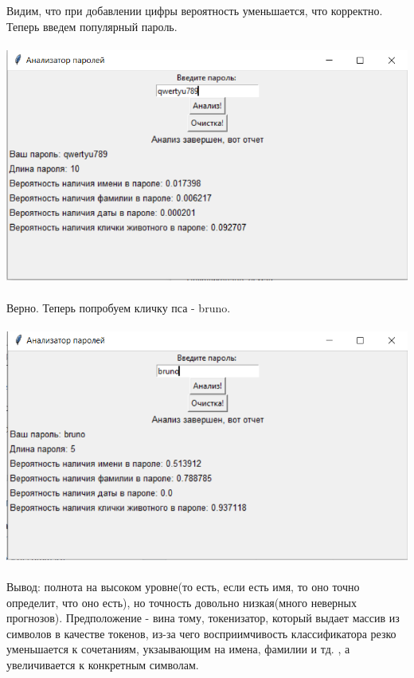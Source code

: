\documentclass[a4paper,12pt]{article}
\begin{document}
Видим, что при добавлении цифры вероятность уменьшается, что корректно. Теперь введем популярный пароль.\\\\
\includegraphics[width=\linewidth]{image7.png}\\\\
Верно. Теперь попробуем кличку пса - bruno.\\\\
\includegraphics[width=\linewidth]{image8.png}\\\\
Вывод: полнота на высоком уровне(то есть, если есть имя, то оно точно определит, что оно есть), но точность довольно низкая(много неверных прогнозов). Предположение - вина тому, токенизатор, который выдает массив из символов в качестве токенов, из-за чего восприимчивость классификатора резко уменьшается к сочетаниям, укзаывающим на имена, фамилии и тд. , а увеличивается к конкретным символам.
\end{document}
